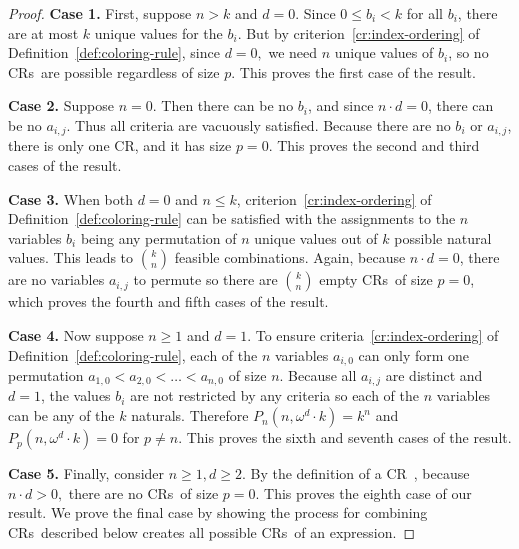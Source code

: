 \documentclass[11pt]{article}
\newcommand{\om}{\omega}
\newcommand{\crulenospace}{CR}
\newcommand{\crule}{\crulenospace~}
\newcommand{\crules}{\crulenospace s~}
\newcommand{\case}[1]{\textbf{Case #1.}}
\newcommand{\numpoints}{n}
\newcommand{\inumpoints}{i}
\newcommand{\idegr}{j}
\newcommand{\commonconst}{a}
\newcommand{\rareconst}{b}
\theoremstyle{plain}
\theoremstyle{definition}
\begin{document}
\begin{proof}
\case{1} First, suppose $\numpoints > k$ and $d = 0$. Since $0 \leq \rareconst_{\inumpoints} < k$ for all $\rareconst_{\inumpoints}$, there are at most $k$
unique values for the $\rareconst_{\inumpoints}$. But by criterion~\ref{cr:index-ordering} of Definition~\ref{def:coloring-rule}, since $d = 0,$ we need $\numpoints$ unique values of $\rareconst_{\inumpoints}$, so no \crules are possible regardless of size $p$. This proves the first case of the result.

\case{2} Suppose $\numpoints = 0$. Then there can be no $\rareconst_{\inumpoints}$, and since $\numpoints \cdot d = 0$, there can be no $\commonconst_{\inumpoints,\idegr}$. Thus all criteria are vacuously satisfied. Because there are no $\rareconst_{\inumpoints}$ or $\commonconst_{\inumpoints,\idegr}$, there is only one \crulenospace, and it has size $p = 0$. This proves the second and third cases of the result.

\case{3} When both $d = 0$ and $\numpoints \leq k$,
criterion~\ref{cr:index-ordering} of Definition~\ref{def:coloring-rule} can be satisfied with the assignments to the $\numpoints$ variables $\rareconst_{\inumpoints}$ being any permutation of $\numpoints$ unique values out of $k$ possible natural values.
This leads to $\binom{k}{\numpoints}$ feasible combinations. Again, because $\numpoints \cdot d = 0$, there are no variables $\commonconst_{\inumpoints,\idegr}$ to permute so there are $\binom{k}{\numpoints}$ empty \crules of size $p=0$, which proves the fourth and fifth cases of the result.

\case{4} Now suppose $\numpoints \geq 1$ and $d = 1$. To ensure criteria~\ref{cr:index-ordering} of Definition~\ref{def:coloring-rule}, each of the $\numpoints$ variables  $\commonconst_{\inumpoints,0}$ can only form one permutation $\commonconst_{1,0} < \commonconst_{2,0} < \ldots < \commonconst_{\numpoints,0}$ of size $\numpoints$. Because all $\commonconst_{\inumpoints,\idegr}$ are distinct and $d = 1$, the values $\rareconst_{\inumpoints}$ are not restricted by any criteria so each of the $\numpoints$ variables can be any of the $k$ naturals. Therefore $P_{\numpoints}\left(\numpoints, \om^d \cdot k \right) = k^{\numpoints}$ and $P_p\left(\numpoints, \om^d \cdot k \right) = 0$ for $p \neq \numpoints$. This proves the sixth and seventh cases of the result.

\case{5} Finally, consider $\numpoints \geq 1, d \geq 2$. By the definition of a \crule, because $\numpoints \cdot d > 0,$ there are no \crules of size $p=0.$ This proves the eighth
case of our result. We prove the final case by showing the process for combining \crules described below creates all possible \crules of an expression.


\end{proof}
\end{document}
